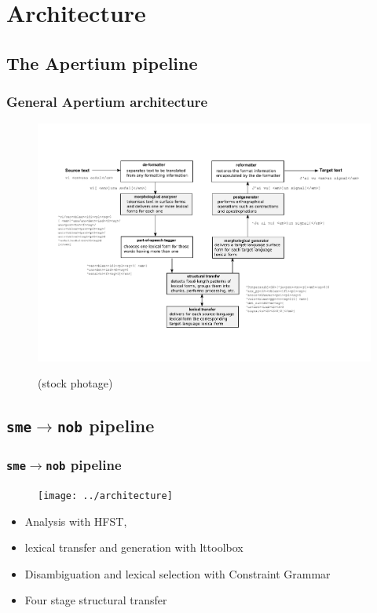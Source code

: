 \documentclass[notes=hide]{beamer}
\newcommand{\sme}{{\tt sme}}
\newcommand{\nob}{{\tt nob}}
\newcommand{\smenob}{\sme$\rightarrow{}$\nob}
\begin{document}
\section{Architecture}
\subsection{The Apertium pipeline}
\begin{frame}\frametitle{General Apertium architecture}
  \begin{figure}[ht]
    \textheight
    \hspace*{-0.03\textwidth}
    \centerline{\includegraphics[width=1.2\textwidth]{apertium-general-architecture}}
    \tiny{(stock photage)}
    \label{fig:general-architecture}
  \end{figure}
\end{frame}


\subsection{\smenob{} pipeline}
\begin{frame}\frametitle{\smenob{} pipeline}
    \begin{figure}
    \begin{center}
      \texttt{[image: ../architecture]}
    \end{center}
    \label{fig:modules}
  \end{figure}

    \textheight
  \begin{itemize}
  \item Analysis with HFST,
  \item lexical transfer and generation with lttoolbox
  \end{itemize}
  \begin{itemize}
  \item Disambiguation and lexical selection with Constraint
    Grammar
  \end{itemize}
  \begin{itemize}
  \item Four stage structural transfer
  \end{itemize}
\end{frame}
\end{document}
